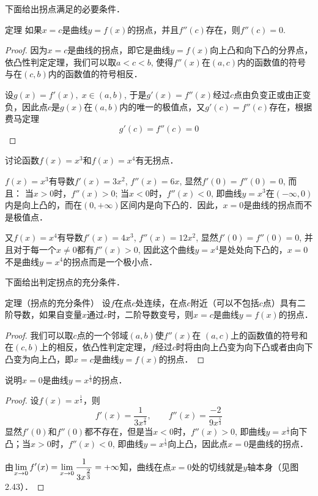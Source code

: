下面给出拐点满足的必要条件．

\begin{blk}
    {定理} 如果$x=c$是曲线$y=f(x)$的拐点，并且$f''(c)$存在，则$f''(c)=0$.
\end{blk}

\begin{proof}
    因为$x=c$是曲线的拐点，即它是曲线$y=f(x)$向上凸和向下凸的分界点，依凸性判定定理，我们可以取$a<c<b$, 使得$f''(x)$在$(a,c)$内的函数值的符号与在$(c,b)$内的函数值的符号相反．

设$g(x)=f'(x),\; x\in (a,b)$, 于是$g'(x)=f''(x)$经过$c$点由负变正或由正变负，因此点$c$是$g(x)$在$(a,b)$内的唯一的极值点，又$g'(c)=f''(c)$存在，根据费马定理
\[g' (c) =f'' (c) =0\]
\end{proof}


\begin{example}
    讨论函数$f(x)=x^3$和$f(x)=x^4$有无拐点．
\end{example}


\begin{solution}
    $f(x)=x^3$有导数$f'(x)=3x^2$, $f''(x)=6x$, 显然$f'(0)=f''(0)=0$, 而且：
当$x>0$时，$f''(x)>0$; 当$x<0$时，$f''(x)<0$, 即曲线$y=x^3$在$(-\infty, 0)$内是向上凸的，而在$(0,+\infty)$区间内是向下凸的．因此，$x=0$是曲线的拐点而不是极值点．

又$f(x)=x^4$有导数$f'(x)=4x^3$, $f''(x)=12x^2$, 显然$f'(0)=f''(0)=0$, 并且对于每一个$x\ne 0$都有$f''(x)>0$, 因此这个曲线$y=x^4$是处处向下凸的，$x=0$不是曲线$y=x^4$的拐点而是一个极小点．
\end{solution}


下面给出判定拐点的充分条件．
    
\begin{blk}
   {定理（拐点的充分条件）} 设$f$在点$c$处连续，在点$c$附近（可以不包括$c$点）具有二阶导数，如果自变量$x$通过$c$时，二阶导数变号，则$x=c$是曲线$y=f(x)$的拐点．
\end{blk}

\begin{proof}
    我们可以取$c$点的一个邻域$(a,b)$使$f''(x)$在
$(a,c)$上的函数值的符号和在$(c,b)$上的相反，依凸性判定定理，$f$经过$c$时将由向上凸变为向下凸或者由向下凸变为向上凸，即$x=c$是曲线$y=f(x)$的拐点．
\end{proof}


\begin{example}
说明$x=0$是曲线$y=x^{\tfrac{1}{3}}$的拐点．
\end{example}

\begin{proof}
    设$f(x)=x^{\tfrac{1}{3}}$，则
\[f'(x)=\frac{1}{3x^{\tfrac{2}{3}}},\qquad f''(x)=\frac{-2}{9x^{\tfrac{5}{3}}}\]
显然$f'(0)$和$f''(0)$都不存在，但是当$x<0$时，$f''(x)>0$, 即曲线$y=x^{\tfrac{1}{3}}$向下凸；当$x>0$时，$f''(x)<0$, 即曲线$y=x^{\tfrac{1}{3}}$向上凸，因此点$x=0$是曲线的拐点．

由$\displaystyle\lim_{x\to 0}f'(x)=\displaystyle\lim_{x\to 0}\dfrac{1}{3x^{\tfrac{2}{3}}}=+\infty$知，曲线在点$x=0$处的切线就是$y$轴本身（见图2.43）．
\end{proof}

